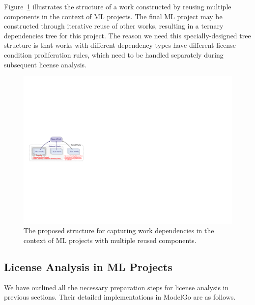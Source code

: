 Figure~\ref{fig:stru} illustrates the structure of a work constructed by reusing multiple components in the context of ML projects.
The final ML project may be constructed through iterative reuse of other works, resulting in a ternary dependencies tree for this project.
The reason we need this specially-designed tree structure is that works with different dependency types have different license condition proliferation rules, which need to be handled separately during subsequent license analysis. 


\begin{figure}[t]
    \centering
    \includegraphics[width=\linewidth]{fig/structure.pdf}
    \caption{The proposed structure for capturing work dependencies in the context of ML projects with multiple reused components.}
    \Description{}
    \label{fig:stru}
    \vspace{-5mm}
\end{figure}

\subsection{License Analysis in ML Projects}

We have outlined all the necessary preparation steps for license analysis in previous sections.
Their detailed implementations in ModelGo are as follows.

